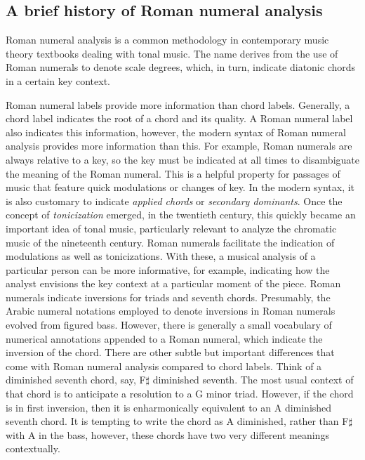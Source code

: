 \subsection{A brief history of Roman numeral analysis}
\label{sec:a_brief_history_of_roman_numeral_analysis}

Roman numeral analysis is a common methodology in contemporary music theory textbooks dealing with tonal music.
The name derives from the use of Roman numerals to denote scale degrees, which, in turn, indicate diatonic chords in a certain key context.

Roman numeral labels provide more information than chord labels.
Generally, a chord label indicates the root of a chord and its quality.
A Roman numeral label also indicates this information, however, the modern syntax of Roman numeral analysis provides more information than this.
For example, Roman numerals are always relative to a key, so the key must be indicated at all times to disambiguate the meaning of the Roman numeral.
This is a helpful property for passages of music that feature quick modulations or changes of key.
In the modern syntax, it is also customary to indicate \emph{applied chords} or \emph{secondary dominants}.
Once the concept of \emph{tonicization} emerged, in the twentieth century, this quickly became an important idea of tonal music, particularly relevant to analyze the chromatic music of the nineteenth century.
Roman numerals facilitate the indication of modulations as well as tonicizations.
With these, a musical analysis of a particular person can be more informative, for example, indicating how the analyst envisions the key context at a particular moment of the piece.
Roman numerals indicate inversions for triads and seventh chords.
Presumably, the Arabic numeral notations employed to denote inversions in Roman numerals evolved from figured bass.
However, there is generally a small vocabulary of numerical annotations appended to a Roman numeral, which indicate the inversion of the chord.
There are other subtle but important differences that come with Roman numeral analysis compared to chord labels.
Think of a diminished seventh chord, say, F$\sharp$ diminished seventh.
The most usual context of that chord is to anticipate a resolution to a G minor triad.
However, if the chord is in first inversion, then it is enharmonically equivalent to an A diminished seventh chord.
It is tempting to write the chord as A diminished, rather than F$\sharp$ with A in the bass, however, these chords have two very different meanings contextually.
